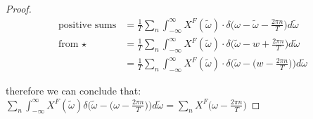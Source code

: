 \documentclass{article}
\begin{document}
\begin{proof}
\begin{equation}
\begin{aligned}
            \text{positive sums} & = \frac{1}{T}\sum_n \int_{-\infty}^{\infty}X^F(\tilde{\omega})\cdot \delta\bigg(\omega-\tilde{\omega}-\frac{2\pi n}{T}\bigg) d\tilde{\omega}\\
            \text{from } \star & = \frac{1}{T}\sum_n \int_{-\infty}^{\infty}X^F(\tilde{\omega})\cdot \delta\bigg(\tilde{\omega}-w+\frac{2\pi n}{T}\bigg) d\tilde{\omega}\\
            & = \frac{1}{T}\sum_n \int_{-\infty}^{\infty}X^F(\tilde{\omega})\cdot \delta\bigg(\tilde{\omega}-\bigg(w-\frac{2\pi n}{T}\bigg)\bigg) d\tilde{\omega}
        \end{aligned}
    \end{equation}

    therefore we can conclude that: $\sum_n \int^\infty_{-\infty} X^F(\tilde{\omega})\delta\bigg(\tilde{\omega}-\bigg(\omega-\frac{2\pi n}{T}\bigg)\bigg)d\tilde{\omega} = \sum_n X^F\bigg(\omega - \frac{2\pi n}{T}\bigg)$
\end{proof}
\end{document}
